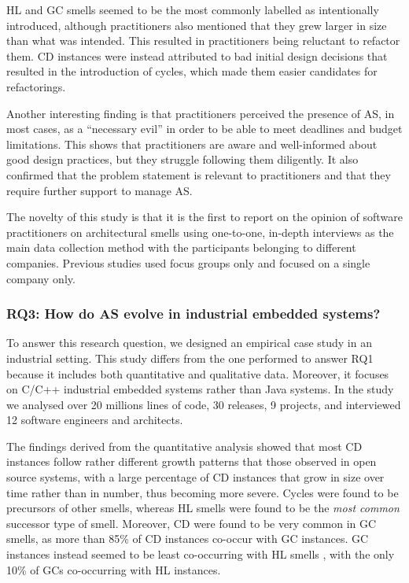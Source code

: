 HL and GC smells seemed to be the most commonly labelled as intentionally introduced, although practitioners also mentioned that they grew larger in size than what was intended.
This resulted in practitioners being reluctant to refactor them.
CD instances were instead attributed to bad initial design decisions that resulted in the introduction of cycles, which made them easier candidates for refactorings.

Another interesting finding is that practitioners perceived the presence of AS, in most cases, as a ``necessary evil'' in order to be able to meet deadlines and budget limitations.
This shows that practitioners are aware and well-informed about good design practices, but they struggle following them diligently.
It also confirmed that the problem statement is relevant to practitioners and that they require further support to manage AS.

The novelty of this study is that it is the first to report on the opinion of software practitioners on architectural smells using one-to-one, in-depth interviews as the main data collection method with the participants belonging to different companies. Previous studies used focus groups only and focused on a single company only.

\subsubsection*{RQ3: How do AS evolve in industrial embedded systems?}
To answer this research question, we designed an empirical case study in an industrial setting.
This study differs from the one performed to answer RQ1 because it includes both quantitative and qualitative data. Moreover, it focuses on C/C++ industrial embedded systems rather than Java systems.
In the study we analysed over 20 millions lines of code, 30 releases, 9 projects, and interviewed 12 software engineers and architects.

The findings derived from the quantitative analysis showed that most CD instances follow rather different growth patterns that those observed in open source systems, with a large percentage of CD instances that grow in size over time rather than in number, thus becoming more severe.
Cycles were found to be precursors of other smells, whereas HL smells were found to be the \emph{most common} successor type of smell.
Moreover, CD were found to be very common in GC smells, as more than 85\% of CD instances co-occur with GC instances.
GC instances instead seemed to be least co-occurring with HL smells , with the only 10\% of GCs co-occurring with HL instances.


